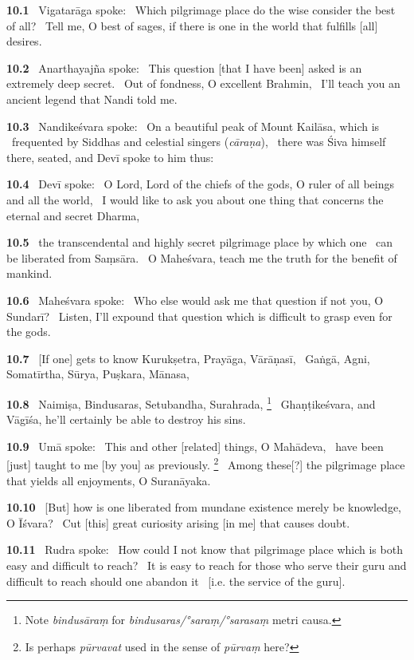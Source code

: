 \documentclass{article}
\newcommand{\skt}[1]{\textit{#1}}
\begin{document}
\textbf{10.1}%
\ Vigatarāga spoke:%
\ Which pilgrimage place do the wise consider the best of all?%
\ Tell me, O best of sages, if there is one in the world that fulfills [all] desires.%


\textbf{10.2}%
\ Anarthayajña spoke:%
\ This question [that I have been] asked is an extremely deep secret.%
\                  Out of fondness, O excellent Brahmin,%
\ I'll teach you an ancient legend that Nandi told me.%


\textbf{10.3}%
\ Nandikeśvara spoke:%
\ On a beautiful peak of Mount Kailāsa, which is%
\                  frequented by Siddhas and celestial singers (\skt{cāraṇa}),%
\ there was Śiva himself there, seated, and Devī spoke to him thus:%


\textbf{10.4}%
\ Devī spoke:%
\ O Lord, Lord of the chiefs of the gods, O ruler of all beings and all the world,%
\ I would like to ask you about one thing that concerns the eternal and secret Dharma,%


\textbf{10.5}%
\ the transcendental and highly secret pilgrimage place by which one%
\                  can be liberated from Saṃsāra.%
\ O Maheśvara, teach me the truth for the benefit of mankind.%


\textbf{10.6}%
\ Maheśvara spoke:%
\ Who else would ask me that question if not you, O Sundarī?%
\ Listen, I'll expound that question which is difficult to grasp even for the gods.%


\textbf{10.7}%
\ [If one] gets to know Kurukṣetra, Prayāga, Vārāṇasī,%
\ Gaṅgā, Agni, Somatīrtha, Sūrya, Puṣkara, Mānasa,%


\textbf{10.8}%
\ Naimiṣa, Bindusaras, Setubandha, Surahrada,%
\footnote{Note \skt{bindusāraṃ} for \skt{bindusaras/°saraṃ/°sarasaṃ} metri causa. }%
\ Ghaṇṭikeśvara, and Vāgīśa, he'll certainly be able to destroy his sins.%


\textbf{10.9}%
\ Umā spoke:%
\ This and other [related] things, O Mahādeva,%
\                                 have been [just] taught to me [by you] as previously.%
\footnote{Is perhaps \skt{pūrvavat} used in the sense of \skt{pūrvaṃ} here? }%
\ Among these[?] the pilgrimage place that yields all enjoyments, O Suranāyaka.%


\textbf{10.10}%
\ [But] how is one liberated from mundane existence merely be knowledge, O Īśvara?%
\ Cut [this] great curiosity arising [in me] that causes doubt.%


\textbf{10.11}%
\ Rudra spoke:%
\ How could I not know that pilgrimage place which is both easy and difficult to reach?%
\ It is easy to reach for those who serve their guru and difficult to reach should one abandon it%
\                                 [i.e. the service of the guru].%
\end{document}
